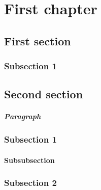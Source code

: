\chapter{First chapter}

\lipsum[1-4]

\section{First section}
\lipsum[5-6]

\subsection{Subsection 1}
\lipsum[7-8]

\section{Second section}
\lipsum[9-10]

\paragraph{Paragraph} \lipsum[17-18]

\subsection{Subsection 1}
\lipsum[11-12]

\subsubsection{Subsubsection}
\lipsum[13-14]

\subsection{Subsection 2}
\lipsum[14-16]
